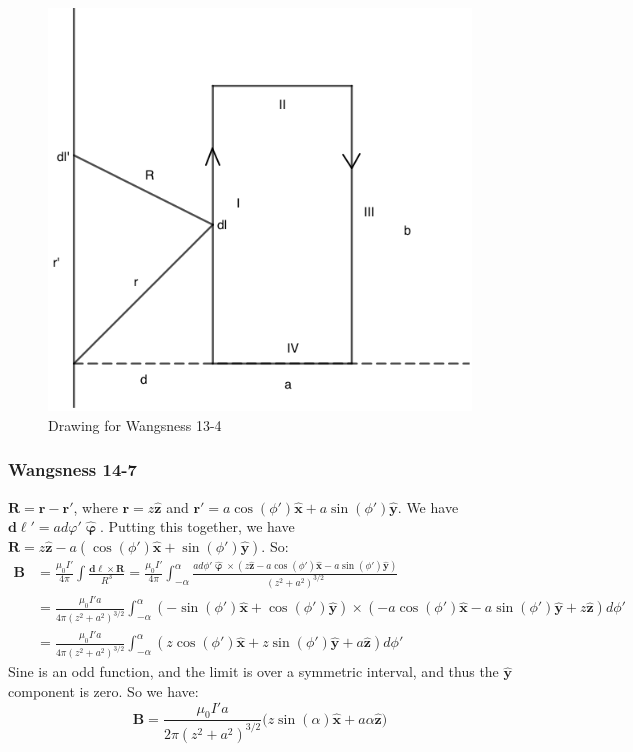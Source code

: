 \documentclass[crop=false,class=article,oneside]{standalone}
\begin{document}
        \begin{figure}[htbp]
            \centering
            \captionsetup{type=figure}
            \includegraphics[scale=0.4]{13-4.png}
            \caption{Drawing for Wangsness 13-4}
        \end{figure}
        \subsubsection{Wangsness 14-7}
        $\mathbf{R} = \mathbf{r}-\mathbf{r}'$, where $\mathbf{r} = z\hat{\mathbf{z}}$ and $\mathbf{r}' = a\cos(\phi')\hat{\mathbf{x}}+a\sin(\phi')\hat{\mathbf{y}}$. We have $\boldsymbol{d\ell}' = ad\varphi' \hat{\boldsymbol{\upvarphi}}$. Putting this together, we have $\mathbf{R} = z\hat{\mathbf{z}} - a(\cos(\phi')\hat{\mathbf{x}}+\sin(\phi')\hat{\mathbf{y}})$. So:
        \begin{align*}
            \mathbf{B} &= \frac{\mu_0 I'}{4\pi}\int \frac{\boldsymbol{d\ell}\times \mathbf{R}}{R^3} = \frac{\mu_0I'}{4\pi} \int_{-\alpha}^{\alpha} \frac{ad\phi' \hat{\boldsymbol{\upvarphi}}\times (z\hat{\mathbf{z}}-a\cos(\phi')\hat{\mathbf{x}}-a\sin(\phi')\hat{\mathbf{y}})}{(z^2+a^2)^{3/2}}\\
            &= \frac{\mu_0 I'a}{4\pi(z^2+a^2)^{3/2}}\int_{-\alpha}^{\alpha} (-\sin(\phi')\hat{\mathbf{x}}+\cos(\phi')\hat{\mathbf{y}})\times (-a\cos(\phi')\hat{\mathbf{x}}-a\sin(\phi')\hat{\mathbf{y}}+z\hat{\mathbf{z}})d\phi'\\
            &= \frac{\mu_0 I'a}{4\pi (z^2+a^2)^{3/2}}\int_{-\alpha}^{\alpha} (z\cos(\phi')\hat{\mathbf{x}}+z\sin(\phi')\hat{\mathbf{y}}+a\hat{\mathbf{z}})d\phi'
        \end{align*}
        Sine is an odd function, and the limit is over a symmetric interval, and thus the $\hat{\mathbf{y}}$ component is zero. So we have:
        \begin{equation*}
            \mathbf{B} = \frac{\mu_0 I' a}{2\pi (z^2+a^2)^{3/2}}\big(z\sin(\alpha)\hat{\mathbf{x}}+a\alpha \hat{\mathbf{z}}\big)    
        \end{equation*}
\end{document}
